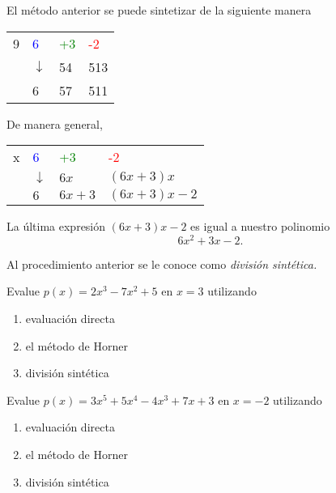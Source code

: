 	El m\'etodo anterior se puede sintetizar de la siguiente manera
	\begin{center}
		\begin{tabular}{l|lll}
			9 & \textcolor{blue}{6} & \textcolor{green}{+3} & \textcolor{red}{-2}\\
			& $\downarrow$ & 54 & 513\\\hline
			& 6 & 57 & 511
		\end{tabular}
	\end{center}
	



	De manera general, 
	\begin{center}
		\begin{tabular}{l|lll}
			x & \textcolor{blue}{6} & \textcolor{green}{+3} & \textcolor{red}{-2}\\
			& $\downarrow$ & $6x$ & $(6x+3)x$\\\hline
			& $6$ & $6x+3$ & $\left( 6x+3 \right)x-2$
		\end{tabular}
	\end{center}
	



	\begin{rem}
		La última expresi\'on $\left( 6x+3 \right)x-2$ es igual a nuestro polinomio
		$$
		6x^{2}+3x-2.
		$$
		
		
		
		Al procedimiento anterior se le conoce como \emph{divisi\'on sint\'etica.}
	\end{rem}
	



	\begin{problema}
		Evalue $p(x)=2x^{3}-7x^{2}+5$ en $x=3$ utilizando
		\begin{enumerate}
			\item evaluaci\'on directa 
			\item el m\'etodo de Horner 
			\item divisi\'on sint\'etica
		\end{enumerate}
		
		
	\end{problema}
	



	\begin{problema}
		Evalue $p(x)=3x^{5}+5x^{4}-4x^{3}+7x+3$ en $x=-2$ utilizando
		\begin{enumerate}
			\item evaluaci\'on directa 
			\item el m\'etodo de Horner 
			\item divisi\'on sint\'etica
		\end{enumerate} 
	\end{problema}



